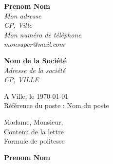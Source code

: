 \documentclass[11pt]{letter}
\begin{document}
     \sffamily
     \hfill
     \begin{flushleft}
     {\bfseries Prenom Nom}\\[.35ex]
     \small\itshape
     Mon adresse\\
     CP, Ville\\[.35ex]
     Mon numéro de téléphone\\
     monsuper@mail.com
     \end{flushleft}
     \begin{flushright}
     {\bfseries Nom de la Société}\\[.35ex]
     \small\itshape
     Adresse de la société\\
     CP, VILLE
     \end{flushright}
     \hfill
     \begin{flushright}
     A Ville, le \today \\
     Référence du poste : Nom du poste
     \end{flushright}
     Madame, Monsieur,\\
    Contenu de la lettre\\
    Formule de politesse\\
     \begin{center}
     {\bfseries Prenom Nom}\\
     \end{center}
     \vfill
     
\end{document}
